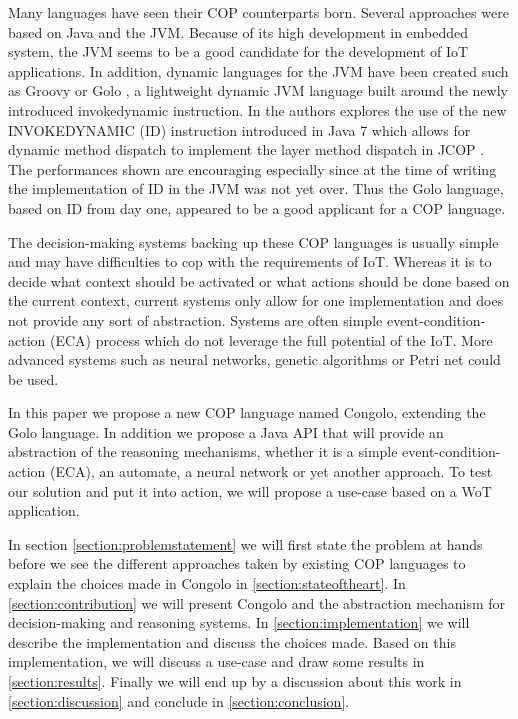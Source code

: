 \documentclass[a4paper]{article}
\begin{document}
Many languages have seen their COP counterparts born. Several approaches were based on Java and the JVM. Because of its high development in embedded system, the JVM seems to be a good candidate for the development of IoT applications. In addition, dynamic languages for the JVM have been created such as Groovy or Golo \cite{ponge_golo_2013}, a lightweight dynamic JVM language built around the newly introduced invokedynamic \cite{jponge_invokedynamic_2013} instruction.  In \cite{appeltauer_layered_2010} the authors explores the use of the new INVOKEDYNAMIC (ID) instruction introduced in Java 7 which allows for dynamic method dispatch to implement the layer method dispatch in JCOP \cite{appeltauer_declarative_2013}. The performances shown are encouraging especially since at the time of writing the implementation of ID in the JVM was not yet over. Thus the Golo language, based on ID from day one, appeared to be a good applicant for a COP language.

The decision-making systems backing up these COP languages is usually simple and may have difficulties to cop with the requirements of IoT. Whereas it is to decide what context should be activated or what actions should be done based on the current context, current systems only allow for one implementation and does not provide any sort of abstraction. Systems are often simple event-condition-action (ECA) process which do not leverage the full potential of the IoT. More advanced systems such as neural networks, genetic algorithms or Petri net could be used.

In this paper we propose a new COP language named Congolo, extending the Golo language. In addition we propose a Java API that will provide an abstraction of the reasoning mechanisms, whether it is a simple event-condition-action (ECA), an automate, a neural network or yet another approach. To test our solution and put it into action, we will propose a use-case based on a WoT application.

In section \ref{section:problemstatement} we will first state the problem at hands before we see the different approaches taken by existing COP languages to explain the choices made in Congolo in \ref{section:stateoftheart}. In \ref{section:contribution} we will present Congolo and the abstraction mechanism for decision-making and reasoning systems. In \ref{section:implementation} we will describe the implementation and discuss the choices made. Based on this implementation, we will discuss a use-case and draw  some results in \ref{section:results}. Finally we will end up by a  discussion about this work in \ref{section:discussion} and conclude in \ref{section:conclusion}.
\end{document}
